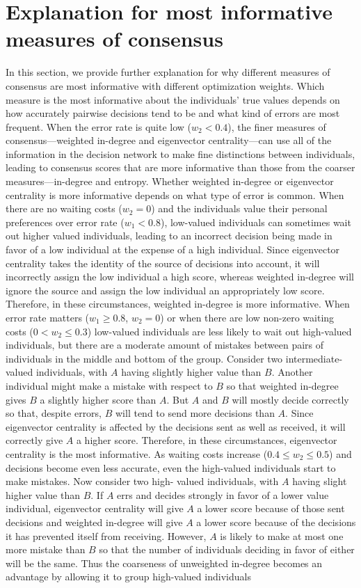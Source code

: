 \documentclass{article}
\begin{document}
\section{Explanation for most informative measures of consensus \label{info_exp}}
In this section, we provide further explanation for why different measures of consensus are most informative with different optimization weights. 
Which measure is the most informative about the individuals' true values depends on how accurately pairwise decisions tend to be and what kind of errors are most frequent. When the error rate is quite low ($w_2<0.4$), the finer measures of consensus---weighted in-degree and eigenvector centrality---can use all of the information in the decision network to make fine distinctions between individuals, leading to consensus scores that are more informative than those from the coarser measures---in-degree and entropy.  Whether weighted in-degree or eigenvector centrality is more informative depends on what type of error is common. When there are no waiting costs ($w_2=0$) and the individuals value their personal preferences over error rate ($w_1<0.8$), low-valued individuals can sometimes wait out higher valued individuals, leading to an incorrect  decision being made in favor of a low individual at the expense of a high individual. Since eigenvector centrality takes the identity of the source of decisions into account, it will incorrectly assign the low individual a high score, whereas weighted in-degree will ignore the source and assign the low individual an appropriately low score.  Therefore, in these circumstances, weighted in-degree is more informative. When error rate matters ($w_1\geq 0.8$, $w_2=0$) or when there are low non-zero waiting costs ($0<w_2\leq 0.3$) low-valued individuals are less likely to wait out high-valued individuals, but there are a moderate amount of mistakes between pairs of individuals in the middle and bottom of the group. Consider two intermediate-valued individuals, with $A$ having slightly higher value than $B$. Another individual might make a mistake with respect to $B$ so that weighted in-degree gives $B$ a slightly higher score than $A$. But $A$ and $B$ will mostly decide correctly so that, despite errors, $B$ will tend to send more decisions than $A$. Since eigenvector centrality is affected by the decisions sent as well as received, it will correctly give $A$ a higher score. Therefore, in these circumstances, eigenvector centrality is the most informative. As waiting costs increase ($0.4 \leq w_2 \leq 0.5$) and decisions become even less accurate, even the high-valued individuals start to make mistakes. Now consider two high- valued individuals, with $A$ having slight higher value than $B$. If $A$ errs and decides strongly in favor of a lower value individual, eigenvector centrality will give $A$ a lower score because of those sent decisions and weighted in-degree will give $A$ a lower score because of the decisions it has prevented itself from receiving. However, $A$ is likely to make at most one more mistake than $B$ so that the number of individuals deciding in favor of either will be the same. Thus the coarseness of unweighted in-degree becomes an advantage by allowing it to group high-valued individuals 
\end{document}
